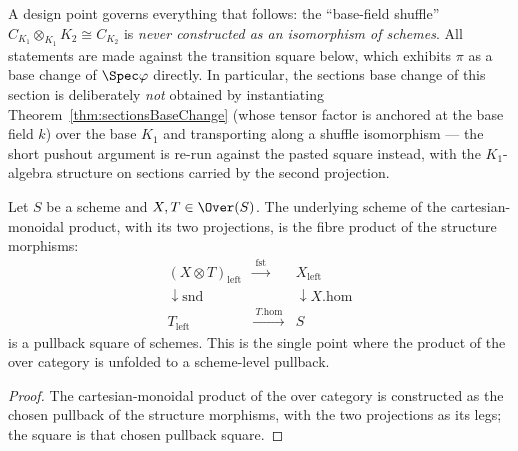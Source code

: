 A design point governs everything that follows: the ``base-field shuffle''
\(C_{K_1} \otimes_{K_1} K_2 \cong C_{K_2}\) is \emph{never constructed as an isomorphism
of schemes}. All statements are made against the transition square below, which exhibits
\(\pi\) as a base change of \(\Spec\varphi\) directly. In particular, the sections base
change of this section is deliberately \emph{not} obtained by instantiating
Theorem~\ref{thm:sectionsBaseChange} (whose tensor factor is anchored at the base field
\(k\)) over the base \(K_1\) and transporting along a shuffle isomorphism --- the short
pushout argument is re-run against the pasted square instead, with the
\(K_1\)-algebra structure on sections carried by the second projection.

\begin{lemma}
  \label{lem:over_isPullback_left}
  \leanok
  Let \(S\) be a scheme and \(X, T \in \Over(S)\). The underlying scheme of the
  cartesian-monoidal product, with its two projections, is the fibre product of the
  structure morphisms:
  \[
    \begin{array}{ccc}
      (X \otimes T)_{\mathrm{left}} & \xrightarrow{\ \mathrm{fst}\ } & X_{\mathrm{left}} \\
      \downarrow \mathrm{snd} & & \downarrow X.\mathrm{hom} \\
      T_{\mathrm{left}} & \xrightarrow{\ T.\mathrm{hom}\ } & S
    \end{array}
  \]
  is a pullback square of schemes. This is the single point where the product of the over
  category is unfolded to a scheme-level pullback.
\end{lemma}
\begin{proof}
  \leanok
  The cartesian-monoidal product of the over category is constructed as the chosen pullback
  of the structure morphisms, with the two projections as its legs; the square is that
  chosen pullback square.
\end{proof}

